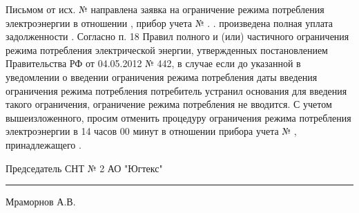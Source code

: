Письмом от          исх. №         направлена заявка на ограничение режима потребления электроэнергии в отношении , прибор учета  № .           .
 произведена полная уплата задолженности      .
Согласно п. 18 Правил полного и (или) частичного ограничения режима потребления электрической энергии, утвержденных постановлением Правительства РФ от 04.05.2012 № 442, в случае если до указанной в уведомлении о введении ограничения режима потребления даты введения ограничения режима потребления потребитель устранил основания для введения такого ограничения, ограничение режима потребления не вводится.
С учетом вышеизложенного, просим отменить процедуру ограничения режима потребления электроэнергии в 14 часов 00 минут     в отношении прибора учета   № , принадлежащего . 

\vspace{5mm}



\vspace{15mm}
\noindent Председатель СНТ № 2 АО "Югтекс" \hfill    \rule{3cm}{0.1 mm}    Мраморнов А.В.